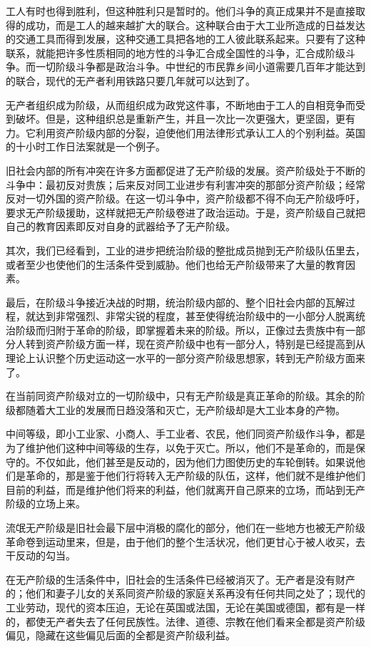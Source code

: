     工人有时也得到胜利，但这种胜利只是暂时的。他们斗争的真正成果并不是直接取得的成功，而是工人的越来越扩大的联合。这种联合由于大工业所造成的日益发达的交通工具而得到发展，这种交通工具把各地的工人彼此联系起来。只要有了这种联系，就能把许多性质相同的地方性的斗争汇合成全国性的斗争，汇合成阶级斗争。而一切阶级斗争都是政治斗争。中世纪的市民靠乡间小道需要几百年才能达到的联合，现代的无产者利用铁路只要几年就可以达到了。

    无产者组织成为阶级，从而组织成为政党这件事，不断地由于工人的自相竞争而受到破坏。但是，这种组织总是重新产生，并且一次比一次更强大，更坚固，更有力。它利用资产阶级内部的分裂，迫使他们用法律形式承认工人的个别利益。英国的十小时工作日法案就是一个例子。

    旧社会内部的所有冲突在许多方面都促进了无产阶级的发展。资产阶级处于不断的斗争中：最初反对贵族；后来反对同工业进步有利害冲突的那部分资产阶级；经常反对一切外国的资产阶级。在这一切斗争中，资产阶级都不得不向无产阶级呼吁，要求无产阶级援助，这样就把无产阶级卷进了政治运动。于是，资产阶级自己就把自己的教育因素即反对自身的武器给予了无产阶级。

    其次，我们已经看到，工业的进步把统治阶级的整批成员抛到无产阶级队伍里去，或者至少也使他们的生活条件受到威胁。他们也给无产阶级带来了大量的教育因素。

    最后，在阶级斗争接近决战的时期，统治阶级内部的、整个旧社会内部的瓦解过程，就达到非常强烈、非常尖锐的程度，甚至使得统治阶级中的一小部分人脱离统治阶级而归附于革命的阶级，即掌握着未来的阶级。所以，正像过去贵族中有一部分人转到资产阶级方面一样，现在资产阶级中也有一部分人，特别是已经提高到从理论上认识整个历史运动这一水平的一部分资产阶级思想家，转到无产阶级方面来了。

    在当前同资产阶级对立的一切阶级中，只有无产阶级是真正革命的阶级。其余的阶级都随着大工业的发展而日趋没落和灭亡，无产阶级却是大工业本身的产物。

    中间等级，即小工业家、小商人、手工业者、农民，他们同资产阶级作斗争，都是为了维护他们这种中间等级的生存，以免于灭亡。所以，他们不是革命的，而是保守的。不仅如此，他们甚至是反动的，因为他们力图使历史的车轮倒转。如果说他们是革命的，那是鉴于他们行将转入无产阶级的队伍，这样，他们就不是维护他们目前的利益，而是维护他们将来的利益，他们就离开自己原来的立场，而站到无产阶级的立场上来。

    流氓无产阶级是旧社会最下层中消极的腐化的部分，他们在一些地方也被无产阶级革命卷到运动里来，但是，由于他们的整个生活状况，他们更甘心于被人收买，去干反动的勾当。

    在无产阶级的生活条件中，旧社会的生活条件已经被消灭了。无产者是没有财产的；他们和妻子儿女的关系同资产阶级的家庭关系再没有任何共同之处了；现代的工业劳动，现代的资本压迫，无论在英国或法国，无论在美国或德国，都有是一样的，都使无产者失去了任何民族性。法律、道德、宗教在他们看来全都是资产阶级偏见，隐藏在这些偏见后面的全都是资产阶级利益。


